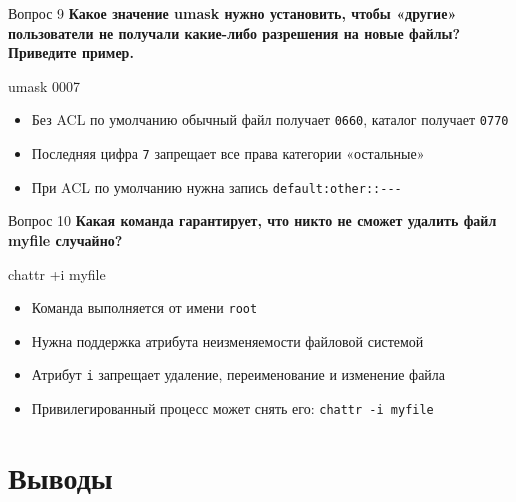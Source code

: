 \documentclass[
  ignorenonframetext,
  aspectratio=169,
  russian,
]{beamer}
\newenvironment{Shaded}{\begin{snugshade}}{\end{snugshade}}
\newcommand{\BuiltInTok}[1]{\textcolor[rgb]{0.00,0.23,0.31}{#1}}
\newcommand{\FunctionTok}[1]{\textcolor[rgb]{0.28,0.35,0.67}{#1}}
\newcommand{\NormalTok}[1]{\textcolor[rgb]{0.00,0.23,0.31}{#1}}
\providecommand{\tightlist}{%
  \setlength{\itemsep}{0pt}\setlength{\parskip}{0pt}}
\begin{document}
\begin{frame}[fragile]{Вопрос 9}
\protect{}\label{ux432ux43eux43fux440ux43eux441-9}
\textbf{Какое значение umask нужно установить, чтобы «другие»
пользователи не получали какие-либо разрешения на новые файлы? Приведите
пример.}

\begin{Shaded}
\begin{Highlighting}[]
\BuiltInTok{umask}\NormalTok{ 0007}
\end{Highlighting}
\end{Shaded}

\begin{itemize}
\tightlist
\item
  Без ACL по умолчанию обычный файл получает \texttt{0660}, каталог
  получает \texttt{0770}
\item
  Последняя цифра \texttt{7} запрещает все права категории «остальные»
\item
  При ACL по умолчанию нужна запись \texttt{default:other::-\/-\/-}
\end{itemize}
\end{frame}

\begin{frame}[fragile]{Вопрос 10}
\protect{}\label{ux432ux43eux43fux440ux43eux441-10}
\textbf{Какая команда гарантирует, что никто не сможет удалить файл
myfile случайно?}

\begin{Shaded}
\begin{Highlighting}[]
\FunctionTok{chattr}\NormalTok{ +i myfile}
\end{Highlighting}
\end{Shaded}

\begin{itemize}
\tightlist
\item
  Команда выполняется от имени \texttt{root}
\item
  Нужна поддержка атрибута неизменяемости файловой системой
\item
  Атрибут \texttt{i} запрещает удаление, переименование и изменение
  файла
\item
  Привилегированный процесс может снять его: \texttt{chattr\ -i\ myfile}
\end{itemize}
\end{frame}

\section{Выводы}\label{ux432ux44bux432ux43eux434ux44b}
\end{document}
